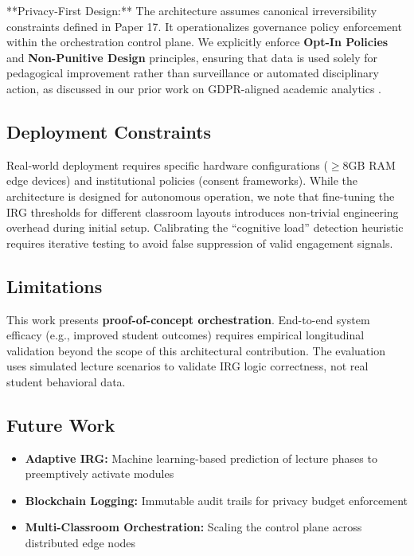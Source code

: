 \documentclass[conference]{IEEEtran}
\begin{document}
**Privacy-First Design:** The architecture assumes canonical irreversibility constraints defined in Paper 17. It operationalizes governance policy enforcement within the orchestration control plane. We explicitly enforce \textbf{Opt-In Policies} and \textbf{Non-Punitive Design} principles, ensuring that data is used solely for pedagogical improvement rather than surveillance or automated disciplinary action, as discussed in our prior work on GDPR-aligned academic analytics \cite{b12}.

\subsection{Deployment Constraints}
Real-world deployment requires specific hardware configurations ($\geq$8GB RAM edge devices) and institutional policies (consent frameworks). While the architecture is designed for autonomous operation, we note that fine-tuning the IRG thresholds for different classroom layouts introduces non-trivial engineering overhead during initial setup. Calibrating the ``cognitive load'' detection heuristic requires iterative testing to avoid false suppression of valid engagement signals.

\subsection{Limitations}
This work presents \textbf{proof-of-concept orchestration}. End-to-end system efficacy (e.g., improved student outcomes) requires empirical longitudinal validation beyond the scope of this architectural contribution. The evaluation uses simulated lecture scenarios to validate IRG logic correctness, not real student behavioral data.

\subsection{Future Work}
\begin{itemize}
    \item \textbf{Adaptive IRG:} Machine learning-based prediction of lecture phases to preemptively activate modules
    \item \textbf{Blockchain Logging:} Immutable audit trails for privacy budget enforcement
    \item \textbf{Multi-Classroom Orchestration:} Scaling the control plane across distributed edge nodes
\end{itemize}

\end{document}
